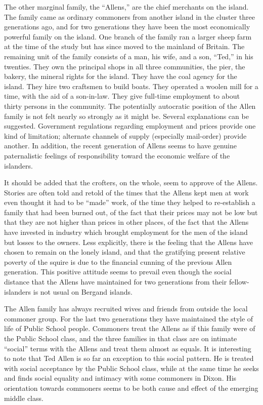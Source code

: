 \documentclass[openany,nobib]{tufte-book}
\begin{document}
The other marginal family, the ``Allens,'' are the chief merchants on
the island. The family came as ordinary commoners from another island in
the cluster three generations ago, and for two generations they have
been the most economically powerful family on the island. One branch of
the family ran a larger sheep farm at the time of the study but has
since moved to the mainland of Britain. The remaining unit of the family
consists of a man, his wife, and a son, ``Ted,'' in his twenties. They
own the principal shops in all three communities, the pier, the bakery,
the mineral rights for the island. They have the coal agency for the
island. They hire two craftsmen to build boats. They operated a woolen
mill for a time, with the aid of a son-in-law. They give full-time
employment to about thirty persons in the community. The potentially
autocratic position of the Allen family is not felt nearly so strongly
as it might be. Several explanations can be suggested. Government
regulations regarding employment and prices provide one kind of
limitation; alternate channels of supply (especially mail-order) provide
another. In addition, the recent generation of Allens seems to have
genuine paternalistic feelings of responsibility toward the economic
welfare of the islanders.

It should be added that the crofters, on the whole, seem to approve of
the Allens. Stories are often told and retold of the times that the
Allens kept men at work even thought it had to be ``made'' work, of the
time they helped to re-establish a family that had been burned out, of
the fact that their prices may not be low but that they are not higher
than prices in other places, of the fact that the Allens have invested
in industry which brought employment for the men of the island but
losses to the owners. Less explicitly, there is the feeling that the
Allens have chosen to remain on the lonely island, and that the
gratifying present relative poverty of the squire is due to the
financial cunning of the previous Allen generation. This positive
attitude seems to prevail even though the social distance that the
Allens have maintained for two generations from their fellow-islanders
is not usual on Bergand islands.

The Allen family has always recruited wives and friends from outside the
local commoner group. For the last two generations they have maintained
the style of life of Public School people. Commoners treat the Allens as
if this family were of the Public School class, and the three families
in that class are on intimate ``social'' terms with the Allens and treat
them almost as equals. It is interesting to note that Ted Allen is so
far an exception to this social pattern. He is treated with social
acceptance by the Public School class, while at the same time he seeks
and finds social equality and intimacy with some commoners in Dixon. His
orientation towards commoners seems to be both cause and effect of the
emerging middle class.
\end{document}
